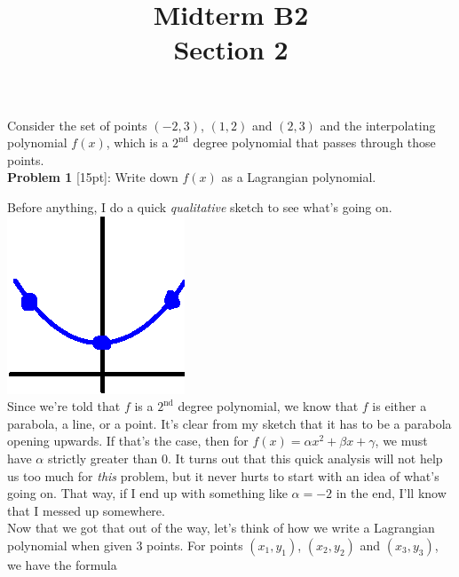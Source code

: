 \documentclass{article}
\def\a{\alpha}
\def\b{\beta}
\def\c{\gamma}
\begin{document}
 
 
 
\title{
    \textmd{\Huge{Midterm B2}}\\
    \textmd{\huge{Section 2}}
}


\maketitle

Consider the set of points $(-2, 3)$, $(1, 2)$ and $(2, 3)$ and the interpolating polynomial $f(x)$, which is a $2^\text{nd}$ degree polynomial that passes through those points. \\

\textbf{Problem 1} [15pt]: Write down $f(x)$ as a Lagrangian polynomial.

Before anything, I do a quick \textit{qualitative} sketch to see what's going on. \hspace*{3cm}\includegraphics[scale=0.5]{thumbSketch}\\

Since we're told that $f$ is a $2^\text{nd}$ degree polynomial, we know that $f$ is either a parabola, a line, or a point. It's clear from my sketch that it has to be a parabola opening upwards. If that's the case, then for $f(x) = \a x^2 + \b x + \c$, we must have $\a$ strictly greater than $0$. It turns out that this quick analysis will not help us too much for \textit{this} problem, but it never hurts to start with an idea of what's going on. That way, if I end up with something like $\a = -2$ in the end, I'll know that I messed up somewhere. \\

Now that we got that out of the way, let's think of how we write a Lagrangian polynomial when given 3 points. For points $(x_1, y_1)$, $(x_2, y_2)$ and $(x_3, y_3)$, we have the formula \\
\end{document}
